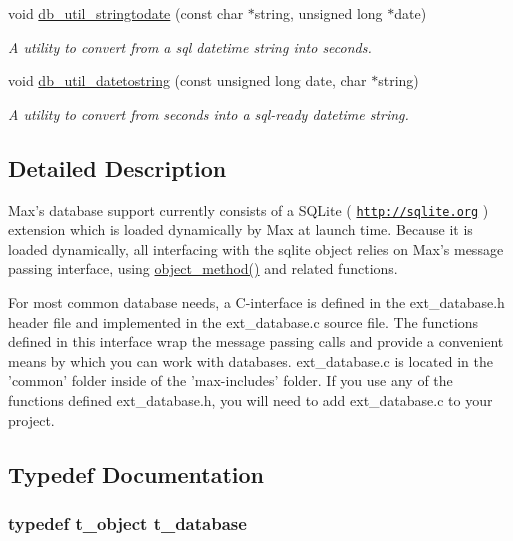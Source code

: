 \begin{DoxyCompactItemize}
void \hyperlink{group__database_ga051ca3fefd1d2e4fe162a943c3d15060}{db\_\-util\_\-stringtodate} (const char $\ast$string, unsigned long $\ast$date)
\begin{DoxyCompactList}\small\item\em A utility to convert from a sql datetime string into seconds. \item\end{DoxyCompactList}\item 
void \hyperlink{group__database_gabf7cfbf2e7218680a8b79d250c1eae19}{db\_\-util\_\-datetostring} (const unsigned long date, char $\ast$string)
\begin{DoxyCompactList}\small\item\em A utility to convert from seconds into a sql-\/ready datetime string. \item\end{DoxyCompactList}\end{DoxyCompactItemize}


\subsection{Detailed Description}
Max's database support currently consists of a SQLite ( \href{http://sqlite.org}{\tt http://sqlite.org} ) extension which is loaded dynamically by Max at launch time. Because it is loaded dynamically, all interfacing with the sqlite object relies on Max's message passing interface, using \hyperlink{group__obj_gae740749094827ac5adc2b7145db1c596}{object\_\-method()} and related functions.

For most common database needs, a C-\/interface is defined in the ext\_\-database.h header file and implemented in the ext\_\-database.c source file. The functions defined in this interface wrap the message passing calls and provide a convenient means by which you can work with databases. ext\_\-database.c is located in the 'common' folder inside of the 'max-\/includes' folder. If you use any of the functions defined ext\_\-database.h, you will need to add ext\_\-database.c to your project. 

\subsection{Typedef Documentation}
\hypertarget{group__database_gad832ea0e5fc292661fd20046cee7e3b3}{
\subsubsection[{t\_\-database}]{\setlength{\rightskip}{0pt plus 5cm}typedef {\bf t\_\-object} {\bf t\_\-database}}}
\label{group__database_gad832ea0e5fc292661fd20046cee7e3b3}


